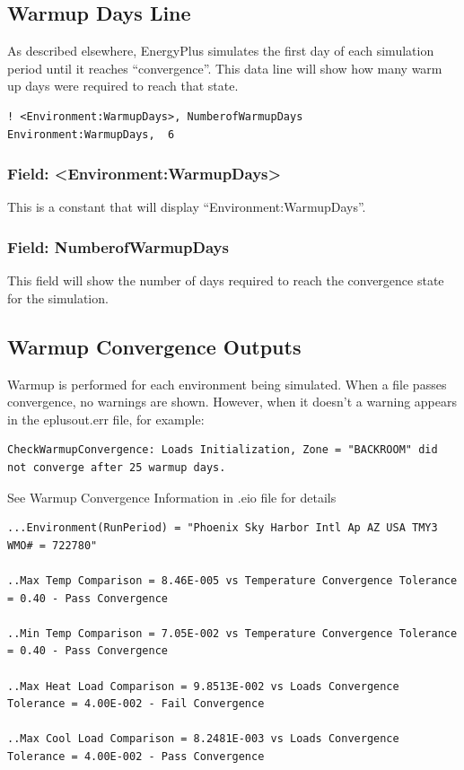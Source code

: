 \subsection{Warmup Days Line}

As described elsewhere, EnergyPlus simulates the first day of each simulation period until it reaches “convergence”. This data line will show how many warm up days were required to reach that state.

\begin{lstlisting}
! <Environment:WarmupDays>, NumberofWarmupDays
Environment:WarmupDays,  6
\end{lstlisting}

\subsubsection{Field: <Environment:WarmupDays>}

This is a constant that will display ``Environment:WarmupDays''.

\subsubsection{Field: NumberofWarmupDays}

This field will show the number of days required to reach the convergence state for the simulation.

\subsection{Warmup Convergence Outputs}

Warmup is performed for each environment being simulated. When a file passes convergence, no warnings are shown.  However, when it doesn’t a warning appears in the eplusout.err file, for example:

\begin{lstlisting}
CheckWarmupConvergence: Loads Initialization, Zone = "BACKROOM" did not converge after 25 warmup days.
\end{lstlisting}

See Warmup Convergence Information in .eio file for details

\begin{lstlisting}
...Environment(RunPeriod) = "Phoenix Sky Harbor Intl Ap AZ USA TMY3 WMO# = 722780"

..Max Temp Comparison = 8.46E-005 vs Temperature Convergence Tolerance = 0.40 - Pass Convergence

..Min Temp Comparison = 7.05E-002 vs Temperature Convergence Tolerance = 0.40 - Pass Convergence

..Max Heat Load Comparison = 9.8513E-002 vs Loads Convergence Tolerance = 4.00E-002 - Fail Convergence

..Max Cool Load Comparison = 8.2481E-003 vs Loads Convergence Tolerance = 4.00E-002 - Pass Convergence
\end{lstlisting}


